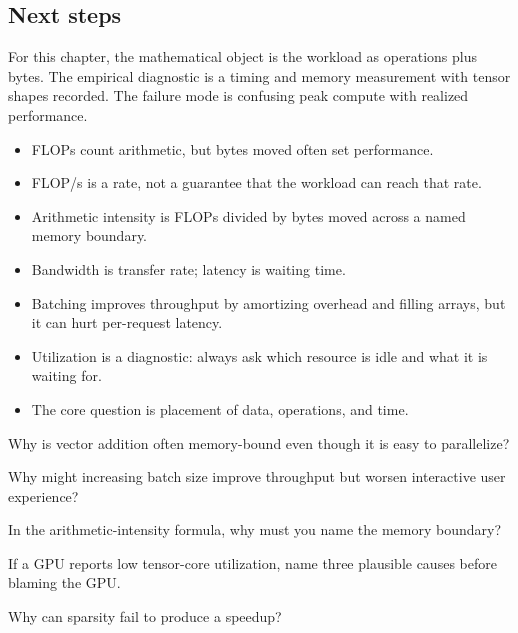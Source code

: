 \subsection{Next steps}

For this chapter, the mathematical object is the workload as operations plus bytes. The empirical diagnostic is a timing and memory measurement with tensor shapes recorded. The failure mode is confusing peak compute with realized performance.

\begin{chaptersummary}
\begin{itemize}[leftmargin=*]
  \item FLOPs count arithmetic, but bytes moved often set performance.
  \item FLOP/s is a rate, not a guarantee that the workload can reach that rate.
  \item Arithmetic intensity is FLOPs divided by bytes moved across a named memory boundary.
  \item Bandwidth is transfer rate; latency is waiting time.
  \item Batching improves throughput by amortizing overhead and filling arrays, but it can hurt per-request latency.
  \item Utilization is a diagnostic: always ask which resource is idle and what it is waiting for.
  \item The core question is placement of data, operations, and time.
\end{itemize}
\end{chaptersummary}

\begin{conceptquestions}
\item Why is vector addition often memory-bound even though it is easy to parallelize?
\item Why might increasing batch size improve throughput but worsen interactive user experience?
\item In the arithmetic-intensity formula, why must you name the memory boundary?
\item If a GPU reports low tensor-core utilization, name three plausible causes before blaming the GPU.
\item Why can sparsity fail to produce a speedup?
\end{conceptquestions}


